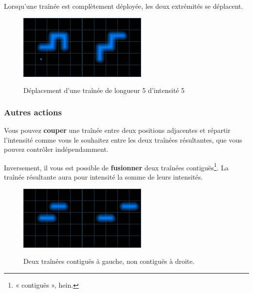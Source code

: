 Lorsqu'une traînée est complètement déployée, les deux extrémités se déplacent.

\begin{figure}[h]
\centering
\includegraphics{deplacement3.png}\hspace{5mm}\includegraphics{deplacement4.png}
\caption{Déplacement d'une traînée de longueur 5 d'intensité 5}
\end{figure}

\subsubsection{Autres actions}

Vous pouvez \textbf{couper} une traînée entre deux positions adjacentes et répartir l'intensité comme vous le souhaitez entre les deux traînées résultantes, que vous pouvez contrôler indépendamment.

Inversement, il vous est possible de \textbf{fusionner} deux traînées contiguës\footnote{« contiguës », hein.}. La traînée résultante aura pour intensité la somme de leurs intensités.

\begin{figure}[h]
\centering
\includegraphics{contigues.png}\hspace{5mm}\includegraphics{noncontigues.png}
\caption{Deux traînées contiguës à gauche, non contiguës à droite.}
\end{figure}

